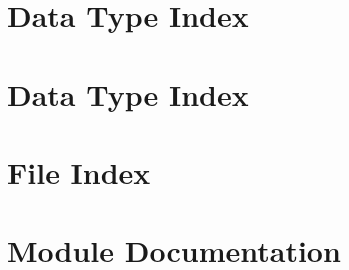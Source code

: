 \let\mypdfximage\pdfximage\def\pdfximage{\immediate\mypdfximage}\documentclass[twoside]{book}
\newcommand{\+}{\discretionary{\mbox{\scriptsize$\hookleftarrow$}}{}{}}
\begin{document}
\chapter{Data Type Index}

\chapter{Data Type Index}

\chapter{File Index}

\chapter{Module Documentation}


























\end{document}
